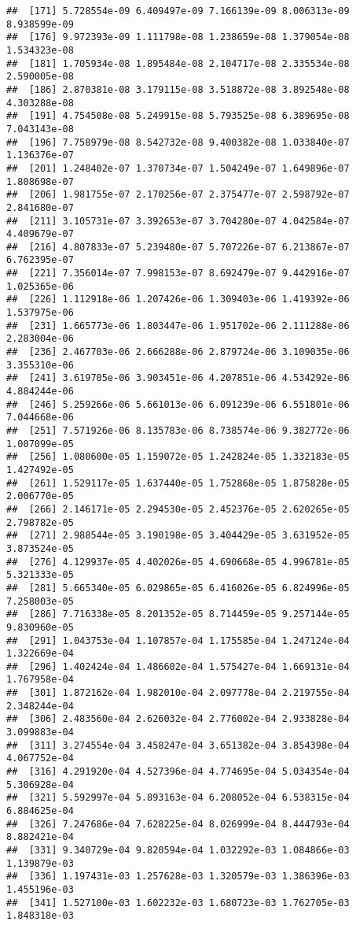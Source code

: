 \documentclass[
]{article}
\begin{document}
\begin{verbatim}
##  [171] 5.728554e-09 6.409497e-09 7.166139e-09 8.006313e-09 8.938599e-09
##  [176] 9.972393e-09 1.111798e-08 1.238659e-08 1.379054e-08 1.534323e-08
##  [181] 1.705934e-08 1.895484e-08 2.104717e-08 2.335534e-08 2.590005e-08
##  [186] 2.870381e-08 3.179115e-08 3.518872e-08 3.892548e-08 4.303288e-08
##  [191] 4.754508e-08 5.249915e-08 5.793525e-08 6.389695e-08 7.043143e-08
##  [196] 7.758979e-08 8.542732e-08 9.400382e-08 1.033840e-07 1.136376e-07
##  [201] 1.248402e-07 1.370734e-07 1.504249e-07 1.649896e-07 1.808698e-07
##  [206] 1.981755e-07 2.170256e-07 2.375477e-07 2.598792e-07 2.841680e-07
##  [211] 3.105731e-07 3.392653e-07 3.704280e-07 4.042584e-07 4.409679e-07
##  [216] 4.807833e-07 5.239480e-07 5.707226e-07 6.213867e-07 6.762395e-07
##  [221] 7.356014e-07 7.998153e-07 8.692479e-07 9.442916e-07 1.025365e-06
##  [226] 1.112918e-06 1.207426e-06 1.309403e-06 1.419392e-06 1.537975e-06
##  [231] 1.665773e-06 1.803447e-06 1.951702e-06 2.111288e-06 2.283004e-06
##  [236] 2.467703e-06 2.666288e-06 2.879724e-06 3.109035e-06 3.355310e-06
##  [241] 3.619705e-06 3.903451e-06 4.207851e-06 4.534292e-06 4.884244e-06
##  [246] 5.259266e-06 5.661013e-06 6.091239e-06 6.551801e-06 7.044668e-06
##  [251] 7.571926e-06 8.135783e-06 8.738574e-06 9.382772e-06 1.007099e-05
##  [256] 1.080600e-05 1.159072e-05 1.242824e-05 1.332183e-05 1.427492e-05
##  [261] 1.529117e-05 1.637440e-05 1.752868e-05 1.875828e-05 2.006770e-05
##  [266] 2.146171e-05 2.294530e-05 2.452376e-05 2.620265e-05 2.798782e-05
##  [271] 2.988544e-05 3.190198e-05 3.404429e-05 3.631952e-05 3.873524e-05
##  [276] 4.129937e-05 4.402026e-05 4.690668e-05 4.996781e-05 5.321333e-05
##  [281] 5.665340e-05 6.029865e-05 6.416026e-05 6.824996e-05 7.258003e-05
##  [286] 7.716338e-05 8.201352e-05 8.714459e-05 9.257144e-05 9.830960e-05
##  [291] 1.043753e-04 1.107857e-04 1.175585e-04 1.247124e-04 1.322669e-04
##  [296] 1.402424e-04 1.486602e-04 1.575427e-04 1.669131e-04 1.767958e-04
##  [301] 1.872162e-04 1.982010e-04 2.097778e-04 2.219755e-04 2.348244e-04
##  [306] 2.483560e-04 2.626032e-04 2.776002e-04 2.933828e-04 3.099883e-04
##  [311] 3.274554e-04 3.458247e-04 3.651382e-04 3.854398e-04 4.067752e-04
##  [316] 4.291920e-04 4.527396e-04 4.774695e-04 5.034354e-04 5.306928e-04
##  [321] 5.592997e-04 5.893163e-04 6.208052e-04 6.538315e-04 6.884625e-04
##  [326] 7.247686e-04 7.628225e-04 8.026999e-04 8.444793e-04 8.882421e-04
##  [331] 9.340729e-04 9.820594e-04 1.032292e-03 1.084866e-03 1.139879e-03
##  [336] 1.197431e-03 1.257628e-03 1.320579e-03 1.386396e-03 1.455196e-03
##  [341] 1.527100e-03 1.602232e-03 1.680723e-03 1.762705e-03 1.848318e-03

\end{verbatim}
\end{document}

